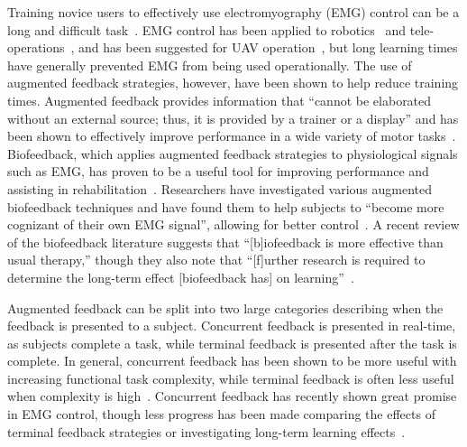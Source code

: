 
Training novice users to effectively use electromyography (EMG) control can be a long and difficult task~\citep{RN24}.
EMG control has been applied to robotics~\citep{RN16, RN17, RN18, RN15} and tele-operations~\citep{RN19}, and has been suggested for UAV operation~\citep{RN14}, but long learning times have generally prevented EMG from being used operationally.
The use of augmented feedback strategies, however, have been shown to help reduce training times.
Augmented feedback provides information that ``cannot be elaborated without an external source; thus, it is provided by a trainer or a display'' and has been shown to effectively improve performance in a wide variety of motor tasks~\citep{sigrist_augmented_2013}.
Biofeedback, which applies augmented feedback strategies to physiological signals such as EMG, has proven to be a useful tool for improving performance and assisting in rehabilitation~\citep{RN26}.
Researchers have investigated various augmented biofeedback techniques and have found them to help subjects to ``become more cognizant of their own EMG signal'', allowing for better control~\citep{RN27}.
A recent review of the biofeedback literature suggests that ``[b]iofeedback is more effective than usual therapy,'' though they also note that ``[f]urther research is required to determine the long-term effect [biofeedback has] on learning''~\citep{RN28}.

Augmented feedback can be split into two large categories describing when the feedback is presented to a subject.
Concurrent feedback is presented in real-time, as subjects complete a task, while terminal feedback is presented after the task is complete.
In general, concurrent feedback has been shown to be more useful with increasing functional task complexity, while terminal feedback is often less useful when complexity is high~\citep{sigrist_augmented_2013}.
Concurrent feedback has recently shown great promise in EMG control, though less progress has been made comparing the effects of terminal feedback strategies or investigating long-term learning effects~\citep{RN31, RN29, RN30, RN32}.

